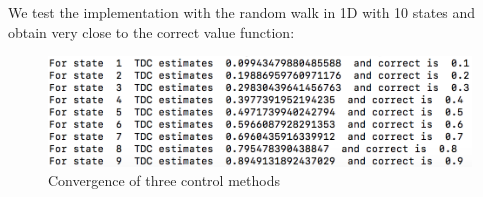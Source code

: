 \documentclass{article}[12pt]
\begin{document}
We test the implementation with the random walk in 1D with 10 states and obtain very close to the correct value function:

 \begin{figure}[h]
  \includegraphics[width=0.75\linewidth]{mrp_results.png}
  \caption{Convergence of three control methods}
  \label{fig:optPol1}
\end{figure}
\end{document}
